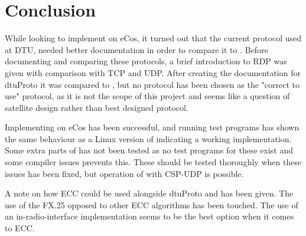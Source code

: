 \section{Conclusion}
\label{sec:conclusion}
While looking to implement \CSP{} on eCos, it turned out that the current protocol used at DTU, needed better documentation in order to compare it to \CSP{}. Before documenting and comparing these protocols, a brief introduction to RDP was given with comparison with TCP and UDP. After creating the documentation for dtuProto it was compared to \CSP{}, but no protocol has been chosen as the "correct to use" protocol, as it is not the scope of this project and seems like a question of satellite design rather than best designed protocol.

Implementing \CSP{} on eCos has been successful, and running test programs has shown the same behaviour as a Linux version of \CSP{} indicating a working implementation. Some extra parts of \CSP{} has not been tested as no test programs for these exist and some compiler issues prevents this. These should be tested thoroughly when these issues has been fixed, but operation of \CSP{} with CSP-UDP is possible.

A note on how ECC could be used alongside dtuProto and \CSP{} has been given. The use of the FX.25 opposed to other ECC algorithms has been touched. The use of an in-radio-interface implementation seems to be the best option when it comes to ECC.


